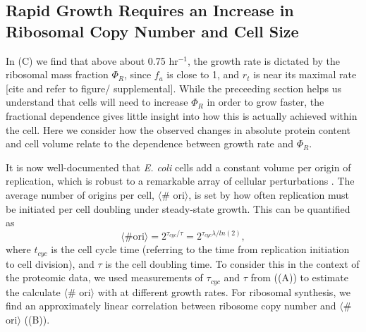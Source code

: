 \subsection{Rapid Growth Requires an Increase in Ribosomal Copy Number and Cell Size}


In (C) we find that above about  0.75 hr$^{-1}$, the growth
rate is dictated by the ribosomal mass fraction $\Phi_R$, since $f_a$ is close
to 1, and $r_t$ is near its maximal rate [cite and refer to figure/
supplemental]. While the preceeding section helps us understand that cells will
need to increase $\Phi_R$ in order to grow faster, the fractional dependence
gives little insight into how this is actually achieved within the cell. Here we
consider how the observed changes in absolute protein content and cell volume
relate to the dependence between growth rate and $\Phi_R$.

It is now well-documented that \textit{E. coli} cells add a constant volume per
origin of replication, which is robust to a remarkable array of cellular
perturbations \citep{si2017}.  The average number of origins per cell, $\langle$\#
ori$\rangle$, is set by how often replication must be initiated per cell doubling
under steady-state growth. This can be quantified as
\begin{equation}
    \langle \text{\# ori} \rangle = 2^{\tau_{cyc} / \tau} = 2^{\tau_{cyc} \lambda / ln(2)},
    \label{eq:Nori}
\end{equation}
where $t_{cyc}$ is the cell cycle time (referring to the time from replication
initiation to cell division), and $\tau$ is the cell doubling time. To consider
this  in the context of the proteomic data, we used measurements of $\tau_{cyc}$
and  $\tau$ from \cite{si2017} ((A)) to estimate
the calculate $\langle$\# ori$\rangle$  with  at different growth
rates. For ribosomal synthesis, we find an approximately linear correlation
between ribosome copy number and $\langle$\# ori$\rangle$
((B)).

